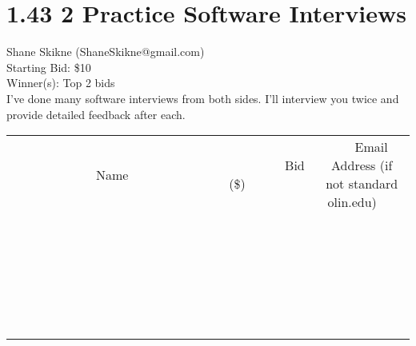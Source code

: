 \documentclass[11pt]{article}
\begin{document}
\section*{1.43 2 Practice Software Interviews}
Shane Skikne (ShaneSkikne@gmail.com) \\
Starting Bid: \$10 \\
Winner(s): 
Top 2 bids \\
I've done many software interviews from both sides. I'll interview you twice and provide detailed feedback after each. \\[6ex]
\begin{tabular}{c c c}
~~~~~~~~~~~~~Name~~~~~~~~~~~~~ & ~~~~~~~~~Bid (\$)~~~~~~~~~ & ~~~Email Address (if not standard olin.edu)~~~ \\
 & & \\
\hline
 & & \\
\hline
 & & \\
\hline
 & & \\
\hline
 & & \\
\hline
 & & \\
\hline
 & & \\
\hline
 & & \\
\hline
 & & \\
\hline
 & & \\
\hline
 & & \\
\hline
 & & \\
\hline
 & & \\
\hline
 & & \\
\hline
 & & \\
\hline
 & & \\
\hline
 & & \\
\hline
 & & \\
\hline
 & & \\
\hline
 & & \\
\hline
 & & \\
\hline
 & & \\
\hline
 & & \\
\hline
 & & \\
\hline
 & & \\
\hline
 & & \\
\hline
\end{tabular}
\clearpage
\end{document}
